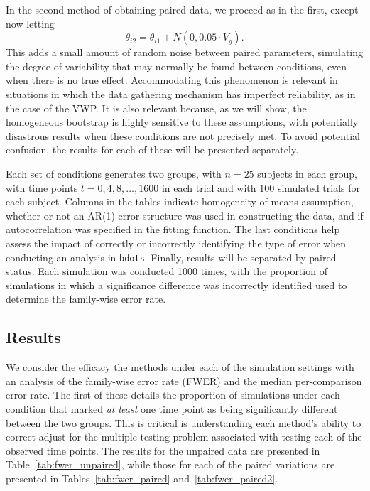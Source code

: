 \documentclass{article}
\newcommand{\xt}{\texttt}
\begin{document}
In the second method of obtaining paired data, we proceed as in the first, except now letting
\begin{equation}
\theta_{i2} = \theta_{i1} + N(0, 0.05 \cdot  V_g).
\end{equation}
This adds a small amount of random noise between paired parameters, simulating the degree of variability that may normally be found between conditions, even when there is no true effect. Accommodating this phenomenon is relevant in situations in which the data gathering mechanism has imperfect reliability, as in the case of the VWP. It is also relevant because, as we will show, the homogeneous bootstrap is highly sensitive to these assumptions, with potentially disastrous results when these conditions are not precisely met. To avoid potential confusion, the results for each of these will be presented separately.


Each set of conditions generates two groups, with $n = 25$ subjects in each group, with time points $t = 0, 4, 8, \dots, 1600$ in each trial and with $100$ simulated trials for each subject. Columns in the tables indicate homogeneity of means assumption, whether or not an AR(1) error structure was used in constructing the data, and if autocorrelation was specified in the fitting function. The last conditions help assess the impact of correctly or incorrectly identifying the type of error when conducting an analysis in \xt{bdots}. Finally, results will be separated by paired status. Each simulation was conducted 1000 times, with the proportion of simulations in which a significance difference was incorrectly identified used to determine the family-wise error rate. 


\subsection{Results}

We consider the efficacy the methods under each of the simulation settings with an analysis of the family-wise error rate (FWER) and the median per-comparison error rate. The first of these details the proportion of simulations under each condition that marked \textit{at least} one time point as being significantly different between the two groups. This is critical is understanding each method's ability to correct adjust for the multiple testing problem associated with testing each of the observed time points. The results for the unpaired data are presented in Table~\ref{tab:fwer_unpaired}, while those for each of the paired variations are presented in Tables~\ref{tab:fwer_paired} and~\ref{tab:fwer_paired2}.
\end{document}

